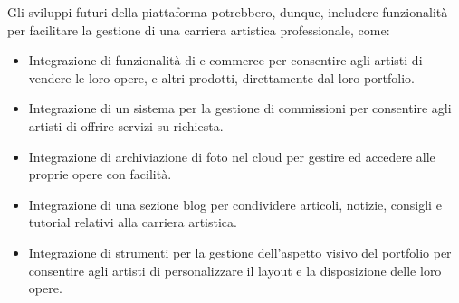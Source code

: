 Gli sviluppi futuri della piattaforma potrebbero, dunque, includere funzionalit\`a per facilitare la gestione di una carriera artistica professionale, come:
\begin{itemize}
	\item Integrazione di funzionalit\`a di e-commerce per consentire agli artisti di vendere le loro opere, e altri prodotti, direttamente dal loro portfolio.
	\item Integrazione di un sistema per la gestione di commissioni per consentire agli artisti di offrire servizi su richiesta.
	\item Integrazione di archiviazione di foto nel cloud per gestire ed accedere alle proprie opere con facilit\`a.
	\item Integrazione di una sezione blog per condividere articoli, notizie, consigli e tutorial relativi alla carriera artistica.
	\item Integrazione di strumenti per la gestione dell'aspetto visivo del portfolio per consentire agli artisti di personalizzare il layout e la disposizione delle loro opere.
\end{itemize}